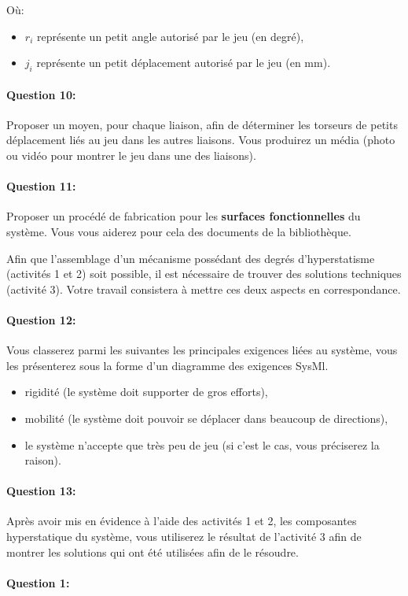 Où:
\begin{itemize}
 \item $r_i$ représente un petit angle autorisé par le jeu (en degré),
 \item $j_i$ représente un petit déplacement autorisé par le jeu (en mm). 
\end{itemize}

\paragraph{Question 10:} Proposer un moyen, pour chaque liaison, afin de déterminer les torseurs de petits déplacement liés au jeu dans les autres liaisons. Vous produirez un média (photo ou vidéo pour montrer le jeu dans une des liaisons).

\paragraph{Question 11:} Proposer un procédé de fabrication pour les \textbf{surfaces fonctionnelles} du système. Vous vous aiderez pour cela des documents de la bibliothèque.

\cleardoublepage


Afin que l'assemblage d'un mécanisme possédant des degrés d'hyperstatisme (activités 1 et 2) soit possible, il est nécessaire de trouver des solutions techniques (activité 3). Votre travail consistera à mettre ces deux aspects en correspondance.

\paragraph{Question 12:} Vous classerez parmi les suivantes les principales exigences liées au système, vous les présenterez sous la forme d'un diagramme des exigences SysMl.

\begin{itemize}
 \item rigidité (le système doit supporter de gros efforts),
 \item mobilité (le système doit pouvoir se déplacer dans beaucoup de directions),
 \item le système n'accepte que très peu de jeu (si c'est le cas, vous préciserez la raison).
\end{itemize}

\paragraph{Question 13:} Après avoir mis en évidence à l'aide des activités 1 et 2, les composantes hyperstatique du système, vous utiliserez le résultat de l'activité 3 afin de montrer les solutions qui ont été utilisées afin de le résoudre.



\pagestyle{correction}\setcounter{section}{0}

\paragraph{Question 1:}
